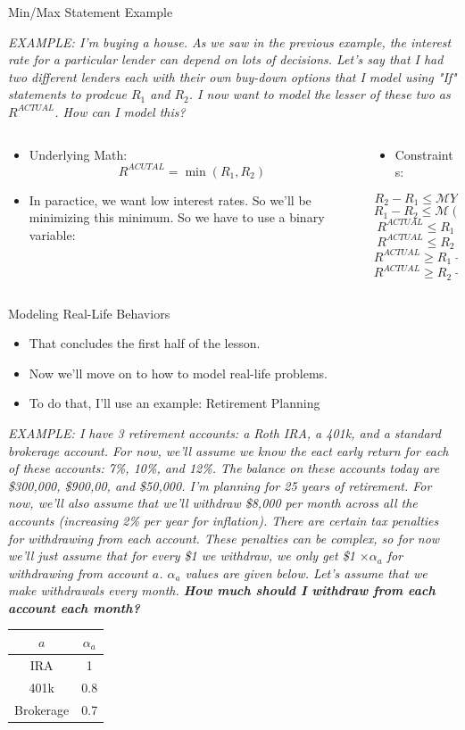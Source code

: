 \documentclass[10pt, aspectratio=169]{beamer}
\newcommand{\retirementProblem}{\textit{EXAMPLE: I have 3 retirement accounts: a Roth IRA, a 401k, and a standard brokerage account. For now, we'll assume we know the eact early return for each of these accounts: 7\%, 10\%, and 12\%. The balance on these accounts today are \$300,000, \$900,00, and \$50,000. I'm planning for 25 years of retirement. For now, we'll also assume that we'll withdraw \$8,000 per month across all the accounts (increasing 2\% per year for inflation). There are certain tax penalties for withdrawing from each account. These penalties can be complex, so for now we'll just assume that for every \$1 we withdraw, we only get \$1 $\times \alpha_a$ for withdrawing from account $a$. $\alpha_a$ values are given below. Let's assume that we make withdrawals every month. \textbf{How much should I withdraw from each account each month?}}}
\begin{document}
\begin{frame}{Min/Max Statement Example}
    \begin{center}
        \textit{EXAMPLE: I'm buying a house. As we saw in the previous example, the interest rate for a particular lender can depend on lots of decisions. Let's say that I had two different lenders each with their own buy-down options that I model using "If" statements to prodcue $R_1$ and $R_2$. I now want to model the lesser of these two as $R^{ACTUAL}$. How can I model this?}
    \end{center}
    \begin{columns}
        \begin{column}{0.5\textwidth}
            \begin{itemize}
                \item Underlying Math:
                $$R^{ACUTAL} = \min(R_1,R_2)$$
                \item In paractice, we want low interest rates. So we'll be minimizing this minimum. So we have to use a binary variable:
            \end{itemize}
        \end{column}
        \begin{column}{0.5\textwidth}
            \begin{itemize}
                \item Constraints:
            \end{itemize}
            $$R_2 - R_1 \leq \mathcal{M} Y$$
            $$R_1 - R_2 \leq \mathcal{M} (1-Y)$$
            $$R^{ACTUAL} \leq R_1$$
            $$R^{ACTUAL} \leq R_2$$
            $$R^{ACTUAL} \geq R_1 -\mathcal{M}(1-Y)$$
            $$R^{ACTUAL} \geq R_2 - \mathcal{M} Y$$
        \end{column}
    \end{columns}
\end{frame}

\begin{frame}{Modeling Real-Life Behaviors}
    \begin{itemize}
        \item That concludes the first half of the lesson.
        \item Now we'll move on to how to model real-life problems.
        \item To do that, I'll use an example: Retirement Planning
    \end{itemize}

    \begin{center}
        \retirementProblem

        \begin{tabular}{|c|c|}
            \hline
            $a$ & $\alpha_a$ \\
            \hline \hline
            IRA & 1 \\
            \hline
            401k & 0.8 \\
            \hline
            Brokerage & 0.7 \\
            \hline
        \end{tabular}
    \end{center}
\end{frame}
\end{document}

